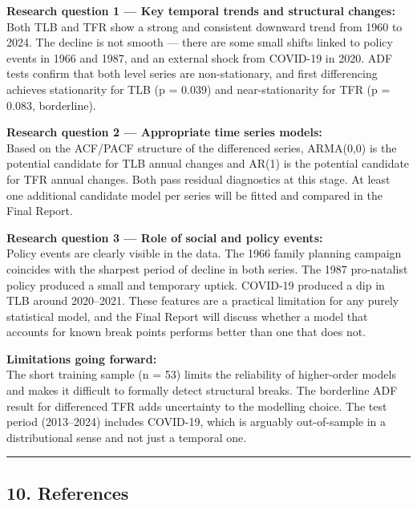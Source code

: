 \documentclass[
]{article}
\begin{document}
\textbf{Research question 1 --- Key temporal trends and structural
changes:}\\
Both TLB and TFR show a strong and consistent downward trend from 1960
to 2024. The decline is not smooth --- there are some small shifts
linked to policy events in 1966 and 1987, and an external shock from
COVID-19 in 2020. ADF tests confirm that both level series are
non-stationary, and first differencing achieves stationarity for TLB (p
= 0.039) and near-stationarity for TFR (p = 0.083, borderline).

\textbf{Research question 2 --- Appropriate time series models:}\\
Based on the ACF/PACF structure of the differenced series, ARMA(0,0) is
the potential candidate for TLB annual changes and AR(1) is the
potential candidate for TFR annual changes. Both pass residual
diagnostics at this stage. At least one additional candidate model per
series will be fitted and compared in the Final Report.

\textbf{Research question 3 --- Role of social and policy events:}\\
Policy events are clearly visible in the data. The 1966 family planning
campaign coincides with the sharpest period of decline in both series.
The 1987 pro-natalist policy produced a small and temporary uptick.
COVID-19 produced a dip in TLB around 2020--2021. These features are a
practical limitation for any purely statistical model, and the Final
Report will discuss whether a model that accounts for known break points
performs better than one that does not.

\textbf{Limitations going forward:}\\
The short training sample (n = 53) limits the reliability of
higher-order models and makes it difficult to formally detect structural
breaks. The borderline ADF result for differenced TFR adds uncertainty
to the modelling choice. The test period (2013--2024) includes COVID-19,
which is arguably out-of-sample in a distributional sense and not just a
temporal one.

\begin{center}\rule{0.5\linewidth}{0.5pt}\end{center}

\subsection{10. References}\label{references}
\end{document}
